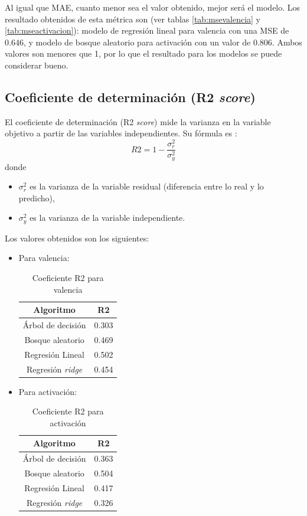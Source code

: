 \documentclass[12pt,a4paper,Spanish]{article}
\begin{document}
Al igual que MAE, cuanto menor sea el valor obtenido, mejor será el modelo. Los resultado obtenidos de esta métrica son (ver tablas \ref{tab:msevalencia} y \ref{tab:mseactivacion}): modelo de regresión lineal para valencia con una MSE de 0.646, y modelo de bosque aleatorio para activación con un valor de 0.806. Ambos valores son menores que 1, por lo que el resultado para los modelos se puede considerar bueno. 

\subsection{Coeficiente de determinación (R2 \textit{score})}
El coeficiente de determinación (R2 \textit{score}) mide la varianza en la variable objetivo a partir de las variables independientes. Su fórmula es \cite{eswiki:158364923}:
\begin{equation}
	R2 = 1 - \frac{\sigma^{2}_r}{\sigma^{2}_y} 
\end{equation}
donde
\begin{itemize}
	\item $\sigma^{2}_r$ es la varianza de la variable residual (diferencia entre lo real y lo predicho),
	\item $\sigma^{2}_y$ es la varianza de la variable independiente.
\end{itemize}

Los valores obtenidos son los siguientes:
\begin{itemize}
	\item Para valencia:
	\begin{table}[H]
		\centering
		\caption{Coeficiente R2 para valencia}
		\label{tab:r2valencia}
		\begin{tabular}{|c|c|}
			\hline
			\textbf{Algoritmo} & \textbf{R2} \\
			\hline
			Árbol de decisión & 0.303 \\
			Bosque aleatorio & 0.469 \\
			Regresión Lineal & 0.502 \\
			Regresión \textit{ridge} & 0.454 \\
			\hline
		\end{tabular}
	\end{table}
	\item Para activación:
	\begin{table}[H]
		\centering
		\caption{Coeficiente R2 para activación}
		\label{tab:r2activacion}
		\begin{tabular}{|c|c|}
			\hline
			\textbf{Algoritmo} & \textbf{R2} \\
			\hline
			Árbol de decisión & 0.363 \\
			Bosque aleatorio & 0.504 \\
			Regresión Lineal & 0.417 \\
			Regresión \textit{ridge} & 0.326 \\
			\hline
		\end{tabular}
	\end{table}
\end{itemize}
\end{document}
